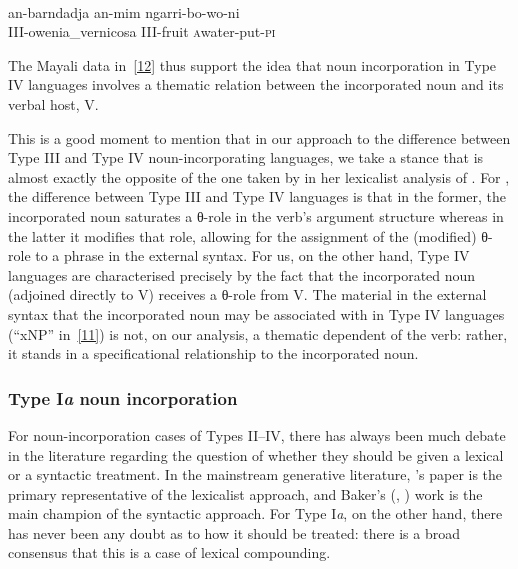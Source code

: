\documentclass[output=paper]{langsci/langscibook}
\newcommand{\posscite}[1]{\citeauthor{#1}'s \citeyearpar{#1}}
\begin{document}
\begin{refcontext}
{\begin{exe}
     \\
    \gll an-barndadja an-mim ngarri-bo-wo-ni\label{i}\\
    III-owenia\_vernicosa III-fruit \First\textsc{a}\normalfont{-}water-put-\textsc{pi}\\
\end{exe}} The Mayali data in~\eqref{12} thus support the idea that noun
incorporation in Type IV languages involves a thematic relation between the
incorporated noun and its verbal host, V.

This is a good moment to mention that in our approach to the difference between Type III
and Type IV noun-incorporating languages, we take a stance that is almost exactly the opposite of
the one taken by \citet{rosen89} in her lexicalist analysis of . For \citet{rosen89},
the difference between Type III and Type IV languages is that in the former, the incorporated noun
saturates a θ{}-role in the verb's argument structure whereas in the latter it modifies that role, allowing
for the assignment of the (modified) θ{}-role to a phrase in the external syntax. For us, on the other
hand, Type IV languages are characterised precisely by the fact that the incorporated noun (adjoined
directly to V) receives a θ{}-role from V. The material in the external syntax that the incorporated noun
may be associated with in Type IV languages (\enquote{xNP} in~\eqref{11}) is not, on our analysis, a thematic
dependent of the verb: rather, it stands in a specificational relationship to the incorporated noun.

\subsubsection{Type I\emph{a} noun incorporation}
For noun-incorporation cases of Types II–IV, there has always been much debate in the literature
regarding the question of whether they should be given a lexical or a syntactic treatment. In the mainstream
generative literature, \posscite{rosen89} paper is the primary representative of the lexicalist
approach, and Baker’s (\citeyear{baker88}, \citeyear{baker96}) work is the main champion of the syntactic approach. For Type
I\emph{a}, on the other hand, there has never been any doubt as to how it should be treated: there is a broad
consensus that this is a case of lexical compounding.


\end{refcontext}
\end{document}
